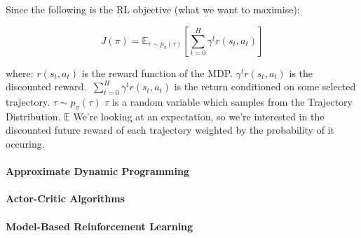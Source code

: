\documentclass{article}
\begin{document}
Since the following is the RL objective (what we want to maximise):

\begin{equation}
\label{eq:1}
J(\pi) = \mathbb{E}_{\tau \sim p_\pi (\tau)} \left[ \sum_{t=0}^H \gamma^t r(s_t, a_t) \right]
\end{equation}

where: \(r(s_t, a_t)\) is the reward function of the MDP. \(\gamma^t r(s_t , a_t)\) is the discounted reward. \(\ \sum_{t=0}^H \gamma^t r(s_t, a_t) \) is the return conditioned on some selected trajectory. \(\tau \sim p_\pi(\tau)\)
\(\tau\) is a random variable which samples from the Trajectory Distribution. \(\mathbb{E}\) We're looking at an expectation, so we're interested in the discounted future reward of each trajectory weighted by the probability of it occuring.


\paragraph{Approximate Dynamic Programming}

\paragraph{Actor-Critic Algorithms}

\paragraph{Model-Based Reinforcement Learning}
\end{document}
